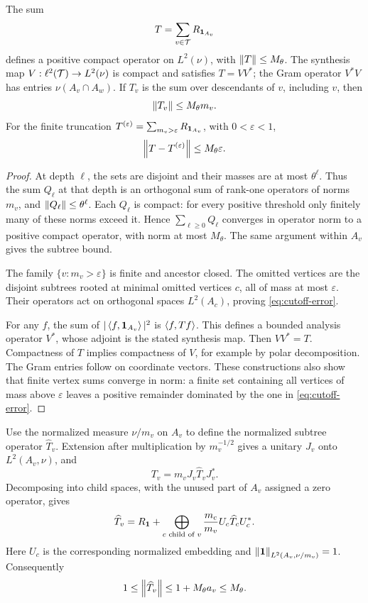 \begin{proposition}\label{prop:compact}
The sum
\[
 T=\sum_{v\in\mathcal T}R_{\mathbf 1_{A_v}}
\]
defines a positive compact operator on $L^2(\nu)$, with $\left\lVert T\right\rVert\le M_\theta$.
The synthesis map $V:\ell^2(\mathcal T)\to L^2(\nu)$ is compact and satisfies
$T=VV^*$; the Gram operator $V^*V$ has entries $\nu(A_v\cap A_w)$.
If $T_v$ is the sum over descendants of $v$, including $v$, then
\[
 \left\lVert T_v\right\rVert\le M_\theta m_v.
\]
For the finite truncation $T^{(\varepsilon)}=\sum_{m_v>\varepsilon}
R_{\mathbf 1_{A_v}}$, with $0<\varepsilon<1$,
\begin{equation}\label{eq:cutoff-error}
 \left\lVert T-T^{(\varepsilon)}\right\rVert\le M_\theta\varepsilon.
\end{equation}
\end{proposition}
\begin{proof}
At depth $\ell$, the sets are disjoint and their masses are at most
$\theta^\ell$. Thus the sum $Q_\ell$ at that depth is an orthogonal
sum of rank-one operators of norms $m_v$, and $\left\lVert Q_\ell\right\rVert\le\theta^\ell$.
Each $Q_\ell$ is compact: for every positive threshold only finitely many
of these norms exceed it. Hence $\sum_{\ell\ge0}Q_\ell$ converges in operator
norm to a positive compact operator, with norm at most $M_\theta$.
The same argument within $A_v$ gives the subtree bound.

The family $\{v:m_v>\varepsilon\}$ is finite and ancestor closed.
The omitted vertices are the disjoint subtrees rooted at minimal omitted
vertices $c$, all of mass at most $\varepsilon$. Their operators act on
orthogonal spaces $L^2(A_c)$, proving \eqref{eq:cutoff-error}.

For any $f$, the sum of $|\left\langle f,\mathbf 1_{A_v}\right\rangle|^2$ is $\left\langle f,Tf\right\rangle$.
This defines a bounded analysis operator $V^*$, whose adjoint is the stated
synthesis map. Then $VV^*=T$. Compactness of $T$ implies compactness of $V$,
for example by polar decomposition. The Gram entries follow on coordinate
vectors. These constructions also show that finite vertex sums converge
in norm: a finite set containing all vertices of mass above $\varepsilon$
leaves a positive remainder dominated by the one in \eqref{eq:cutoff-error}.
\end{proof}

Use the normalized measure $\nu/m_v$ on $A_v$ to define the normalized
subtree operator $\widehat T_v$. Extension after multiplication by
$m_v^{-1/2}$ gives a unitary $J_v$ onto $L^2(A_v,\nu)$, and
\[
 T_v=m_v J_v\widehat T_vJ_v^*.
\]
Decomposing into child spaces, with the unused part of $A_v$ assigned a
zero operator, gives
\begin{equation}\label{eq:normalized-decomposition}
 \widehat T_v=R_{\mathbf 1}+
 \bigoplus_{c\text{ child of }v}\frac{m_c}{m_v}
 U_c\widehat T_cU_c^* .
\end{equation}
Here $U_c$ is the corresponding normalized embedding and
$\left\lVert \mathbf 1\right\rVert_{L^2(A_v,\nu/m_v)}=1$. Consequently
\begin{equation}\label{eq:subtree-norm}
 1\le\left\lVert \widehat T_v\right\rVert\le1+M_\theta a_v\le M_\theta.
\end{equation}

